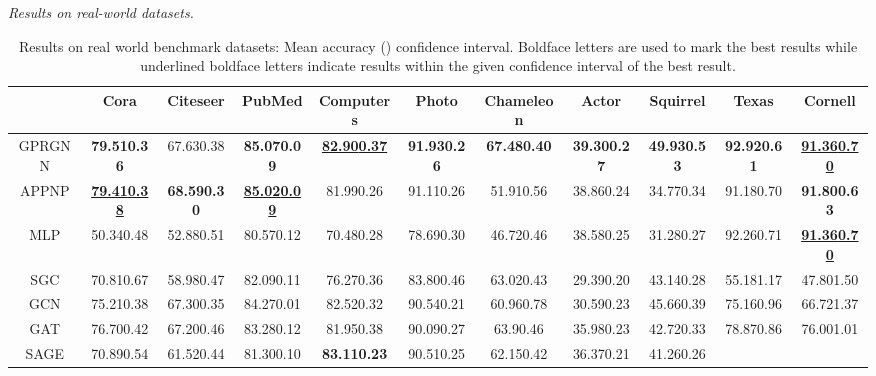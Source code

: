 \documentclass{article} \usepackage{iclr2021_conference,times}
\begin{document}
\emph{Results on real-world datasets. }
\begin{table}[t]
\setlength{\tabcolsep}{2.5pt}
\caption{Results on real world benchmark datasets: Mean accuracy ()   confidence interval. Boldface letters are used to mark the best results while underlined boldface letters indicate results within the given confidence interval of the best result.}
\vspace{0.2cm}
\label{tab:realdata_results}
\scriptsize
\begin{tabular}{@{}ccccccccccc@{}}
\toprule
 &
  Cora &
  Citeseer &
  PubMed &
  Computers &
  Photo &
  Chameleon &
  Actor &
  Squirrel &
  Texas &
  Cornell \\ \midrule
GPRGNN &
  \textbf{79.51\tiny{0.36}} &
  67.63\tiny{0.38} &
  \textbf{85.07\tiny{0.09}} &
  {\ul\textbf{82.90\tiny{0.37}}} &
  \textbf{91.93\tiny{0.26}} &
  \textbf{67.48\tiny{0.40}} &
  \textbf{39.30\tiny{0.27}} &
  \textbf{49.93\tiny{0.53}} &
  \textbf{92.92\tiny{0.61}} &
  {\ul \textbf{91.36\tiny{0.70}}} \\
APPNP &
  {\ul \textbf{79.41\tiny{0.38}}} &
  \textbf{68.59\tiny{0.30}} &
  {\ul \textbf{85.02\tiny{0.09}}} &
  81.99\tiny{0.26} &
  91.11\tiny{0.26} &
  51.91\tiny{0.56} &
  38.86\tiny{0.24} &
  34.77\tiny{0.34} &
  91.18\tiny{0.70} &
  \textbf{91.80\tiny{0.63}} \\
MLP &
  50.34\tiny{0.48} &
  52.88\tiny{0.51} &
  80.57\tiny{0.12} &
  70.48\tiny{0.28} &
  78.69\tiny{0.30} &
  46.72\tiny{0.46} &
  38.58\tiny{0.25} &
  31.28\tiny{0.27} &
  92.26\tiny{0.71} &
  {\ul \textbf{91.36\tiny{0.70}}} \\
SGC &
  70.81\tiny{0.67} &
  58.98\tiny{0.47} &
  82.09\tiny{0.11} &
  76.27\tiny{0.36} &
  83.80\tiny{0.46} &
  63.02\tiny{0.43} &
  29.39\tiny{0.20} &
  43.14\tiny{0.28} &
  55.18\tiny{1.17} &
  47.80\tiny{1.50} \\
GCN &
  75.21\tiny{0.38} &
  67.30\tiny{0.35} &
  84.27\tiny{0.01} &
  82.52\tiny{0.32} &
  90.54\tiny{0.21} &
  60.96\tiny{0.78} &
  30.59\tiny{0.23} &
  45.66\tiny{0.39} &
  75.16\tiny{0.96} &
  66.72\tiny{1.37} \\
GAT &
  76.70\tiny{0.42} &
  67.20\tiny{0.46} &
  83.28\tiny{0.12} &
  81.95\tiny{0.38} &
  90.09\tiny{0.27} &
  63.9\tiny{0.46} &
  35.98\tiny{0.23} &
  42.72\tiny{0.33} &
  78.87\tiny{0.86} &
  76.00\tiny{1.01} \\
SAGE &
  70.89\tiny{0.54} &
  61.52\tiny{0.44} &
  81.30\tiny{0.10} &
  \textbf{83.11\tiny{0.23}} &
  90.51\tiny{0.25} &
  62.15\tiny{0.42} &
  36.37\tiny{0.21} &
  41.26\tiny{0.26} &

\end{tabular}
\end{table}
\end{document}

